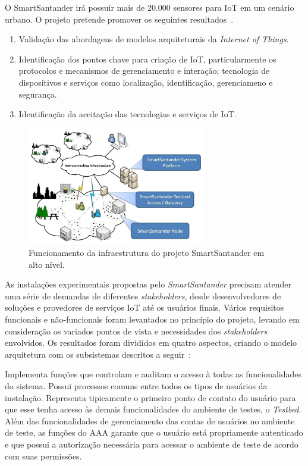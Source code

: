 O SmartSantander irá possuir mais de 20.000 sensores para IoT em um cenário urbano. O projeto pretende promover os
seguintes resultados~\cite{smartsantandersite}.
\begin{enumerate}
\item Validação das abordagens de modelos arquiteturais da \textit{Internet of Things}.
\item Identificação dos pontos chave para criação de IoT, particularmente os protocolos e mecanismos de gerenciamento e
interação; tecnologia de dispositivos e serviços como localização, identificação, gerenciameno e segurança.
\item Identificação da aceitação das tecnologias e serviços de IoT.
\end{enumerate}

\begin{figure}[H]
	\centering
		\includegraphics[width=0.7\textwidth]{fig/smartsantander.jpg}
	\caption{Funcionamento da infraestrutura do projeto SmartSantander em alto nível.}
\end{figure}

As instalações experimentais propostas pelo \textit{SmartSantander} precisam atender uma série de demandas
de diferentes \textit{stakeholders}, desde desenvolvedores de soluções e provedores de serviços IoT até os usuários finais.
Vários requisitos funcionais e não-funcionais foram levantados no princípio do projeto, levando em consideração
os variados pontos de vista e necessidades dos \textit{stakeholders} envolvidos. Os resultados foram divididos em quatro
aspectos, criando o modelo arquitetura com os subsistemas descritos a seguir~\cite{citeulike:13508566}:


Implementa funções que controlam e auditam o acesso à todas as funcionalidades do sistema. Possui processos
comuns entre todos os tipos de usuários da instalação. Representa tipicamente o primeiro ponto de contato
do usuário para que esse tenha acesso às demais funcionalidades do ambiente de testes, o \textit{Testbed}.
Além das funcionalidades de gerenciamento das contas de usuários no ambiente de teste, as funções
do AAA garante que o usuário está propriamente autenticado e que possui a autorização necessária para
acessar o ambiente de teste de acordo com suas permissões.


